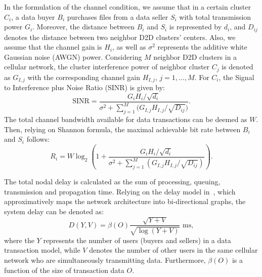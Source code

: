 \documentclass[11pt,draftcls]{IEEEtran}{\onecolumn}
\begin{document}
In the formulation of the channel condition, we assume that in a certain cluster $C_{i}$, a data buyer $B_{i}$ purchases files from a data seller $S_{i}$ with total transmission power $G_{i}$. Moreover, the distance between $B_{i}$ and $S_{i}$ is represented by $d_{i}$, and $D_{ij}$ denotes the distance between two neighbor D2D clusters' centers. Also, we assume that the channel gain is $H_{i}$, as well as $\sigma^2$ represents the additive white Gaussian noise (AWGN) power. Considering $M$ neighbor D2D clusters in a cellular network, the cluster interference power of neighbor cluster $C_{j}$ is denoted as $G_{I,j}$ with the corresponding channel gain $H_{I,j}$, $j=1,\ldots,M$. For $C_{i}$, the Signal to Interference plus Noise Ratio (SINR) is given by:
\begin{equation}\label{SNRi}
\textrm{SINR}=\frac{{{G}_{i}}H_{i}/\sqrt{{{d}_{i}}}}{{{\sigma }^{2}}+\sum\limits_{j=1}^{M}{({G_{I,j}}H_{I,j}/\sqrt{{{D}_{ij}}}})}.
\end{equation}
The total channel bandwidth available for data transactions can be deemed as $W$. Then, relying on Shannon formula, the maximal achievable bit rate between $B_{i}$ and $S_{i}$ follows:
\begin{equation}\label{Ri}
{{R}_{i}}=W{{\log }_{2}}\left(1+\frac{{{G}_{i}}H_{i}/\sqrt{{{d}_{i}}}}{{{\sigma }^{2}}+\sum\limits_{j=1}^{M}{({G_{I,j}}H_{I,j}/\sqrt{{{D}_{ij}}})}}\right).
\end{equation}

The total nodal delay is calculated as the sum of processing, queuing, transmission and propagation time. Relying on the delay model in~\cite{103}, which approximatively maps the network architecture into bi-directional graphs, the system delay can be denoted as:
\begin{equation}\label{D}
D(Y,V)= \beta(O) \frac{\sqrt{Y+V}}{\sqrt{\log{(Y+V)}}}\textrm{ ms},
\end{equation}
where the $Y$ represents the number of users (buyers and sellers) in a data transaction model, while $V$ denotes the number of other users in the same cellular network who are simultaneously transmitting data. Furthermore, $\beta(O)$ is a function of the size of transaction data $O$.
\end{document}
